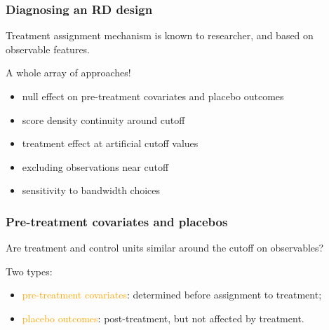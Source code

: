 \documentclass[12pt,english,dvipsnames,aspectratio=169,handout]{beamer}\usepackage[]{graphicx}\usepackage[]{xcolor}
\begin{document}
\begin{frame}
\frametitle{Diagnosing an RD design}
Treatment assignment mechanism is known to researcher, and based on observable features.\bigskip
\pause

A whole array of approaches!

\begin{itemize}
\item null effect on pre-treatment covariates and placebo outcomes
\item score density continuity around cutoff
\item treatment effect at artificial cutoff values
\item excluding observations near cutoff
\item sensitivity to bandwidth choices
\end{itemize}

\end{frame}


\begin{frame}
\frametitle{Pre-treatment covariates and placebos}
Are treatment and control units similar around the cutoff on observables?\bigskip
\pause

Two types:

\begin{itemize}
\item \textcolor{orange}{pre-treatment covariates}: determined before assignment to treatment;
\item \textcolor{orange}{placebo outcomes}: post-treatment, but not affected by treatment.
\end{itemize}

\end{frame}
\end{document}
